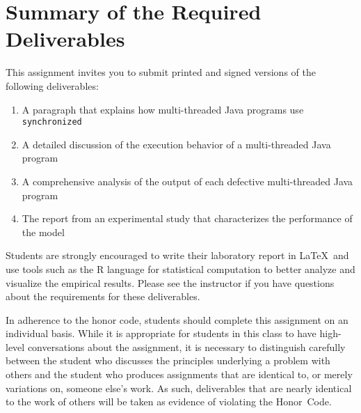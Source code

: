 \section*{Summary of the Required Deliverables}

This assignment invites you to submit printed and signed versions of the following deliverables: 

\begin{enumerate} \item A paragraph that explains how multi-threaded Java programs use {\tt synchronized} \item A
    detailed discussion of the execution behavior of a multi-threaded Java program \item A comprehensive analysis of the
    output of each defective multi-threaded Java program \item The report from an experimental study that characterizes
    the performance of the model \end{enumerate}

Students are strongly encouraged to write their laboratory report in \LaTeX~and use tools such as the R language for
statistical computation to better analyze and visualize the empirical results. Please see the instructor if you have
questions about the requirements for these deliverables.

In adherence to the honor code, students should complete this assignment on an individual basis. While it is appropriate
for students in this class to have high-level conversations about the assignment, it is necessary to distinguish
carefully between the student who discusses the principles underlying a problem with others and the student who produces
assignments that are identical to, or merely variations on, someone else's work.  As such, deliverables that are nearly
identical to the work of others will be taken as evidence of violating the \mbox{Honor Code}.  



  
